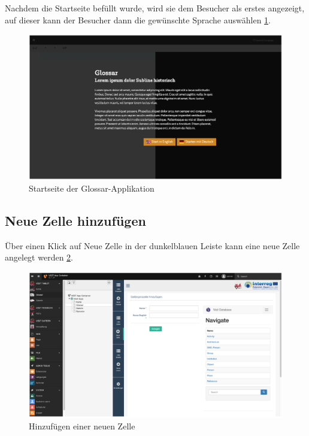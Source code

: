 Nachdem die Startseite befüllt wurde, wird sie dem Besucher als erstes angezeigt, auf dieser kann der Besucher dann die gewünschte Sprache auswählen \ref{img:startseite_glossar_tablet}.

\begin{figure}[ht!]
\centering
\includegraphics[width=12cm]{Figures/paula/glossar/startseite_glossar_tablet.png}
\caption{Startseite der Glossar-Applikation}
\label{img:startseite_glossar_tablet}
\end{figure}


\subsection{Neue Zelle hinzufügen}

Über einen Klick auf \glqq Neue Zelle\grqq{} in der dunkelblauen Leiste kann eine neue Zelle angelegt werden \ref{img:hinzufuegen_neue_zelle}.

\begin{figure}[ht!]
\centering
\includegraphics[width=12cm]{Figures/paula/glossar/hinzufuegen_neue_zelle.png}
\caption{Hinzufügen einer neuen Zelle}
\label{img:hinzufuegen_neue_zelle}
\end{figure}

